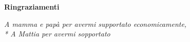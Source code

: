 \thispagestyle{empty}

\begin{center}
  {\bf \Huge Ringraziamenti}
\end{center}

\vspace{4cm}


\emph{
	A mamma e papà per avermi supportato economicamente,\\*
 	 A Mattia per avermi sopportato  
}
